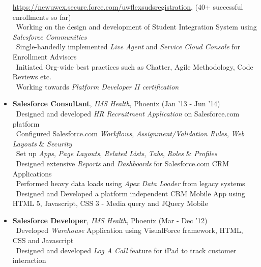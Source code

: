 \documentclass[11pt]{article}
\begin{document}
\begin{itemize}
		\url{https://newuwex.secure.force.com/uwflexsudsregistration}, (40+ successful enrollments so far)\\
		\noindent \textendash\ Working on the design and development of Student 
		Integration System using \textit{Salesforce Communities}\\
		\noindent \textendash\ Single-handedly implemented \textit{Live Agent} and 
		\textit{Service Cloud Console} for Enrollment Advisors\\
		\noindent \textendash\ Initiated Org-wide best practices such as Chatter, Agile 
		Methodology, Code Reviews etc.\\
		\noindent \textendash\ Working towards \textit{Platform Developer II certification} \\
	\item{\textbf{Salesforce Consultant}, \textit{IMS Health}, Phoenix \hfill (Jan '13 - 
	Jun '14)}\\
		\noindent \textendash\ Designed and developed \textit{HR Recruitment Application} on Salesforce.com platform\\
		\textendash\ Configured Salesforce.com \textit{Workflows}, \textit{Assignment/Validation Rules}, \textit{Web Layouts} \& \textit{Security}\\
		\textendash\ Set up \textit{Apps}, \textit{Page Layouts}, \textit{Related Lists}, \textit{Tabs}, \textit{Roles} \& \textit{Profiles}\\
		\textendash\ Designed extensive \textit{Reports} and \textit{Dashboards} for Salesforce.com CRM Applications\\
		\textendash\ Performed heavy data loads using \textit{Apex Data Loader} from legacy systems\\
\textendash\ Designed and Developed a platform independent CRM Mobile App using HTML 5, Javascript, CSS 3 - Media query and JQuery Mobile\\
	\item{\textbf{Salesforce Developer}, \textit{IMS Health}, Phoenix \hfill (Mar - Dec '12)}\\
		\textendash\ Developed \textit{Warehouse} Application using VisualForce framework, HTML, CSS and Javascript\\
		\textendash\ Designed and developed \textit{Log A Call} feature for iPad to track customer interaction\\

\end{itemize}
\end{document}
